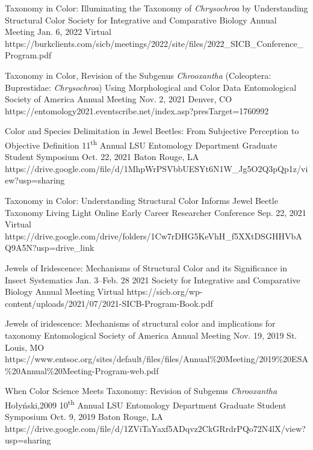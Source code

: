 \documentclass{article}
\newcommand{\ts}{\textsuperscript}
\begin{document}
{Taxonomy in Color: Illuminating the Taxonomy of \textit{Chrysochroa} by Understanding Structural Color}
{Society for Integrative and Comparative Biology Annual Meeting} 
{Jan. 6, 2022}
{Virtual}
{https://burkclients.com/sicb/meetings/2022/site/files/2022_SICB_Conference_Program.pdf}

{Taxonomy in Color, Revision of the Subgenus \textit{Chrooxantha} (Coleoptera: Buprestidae: \textit{Chrysochroa}) Using Morphological and Color Data}
{Entomological Society of America Annual Meeting}
{Nov. 2, 2021}
{Denver, CO}
{https://entomology2021.eventscribe.net/index.asp?presTarget=1760992}

{Color and Species Delimitation in Jewel Beetles: From Subjective Perception to Objective Definition}
{11\ts{th} Annual LSU Entomology Department Graduate Student Symposium}
{Oct. 22, 2021}
{Baton Rouge, LA}
{https://drive.google.com/file/d/1MhpWrPSVbbUESYt6N1W_Jg5O2Q3pQp1z/view?usp=sharing}

{Taxonomy in Color: Understanding Structural Color Informs Jewel Beetle Taxonomy}
{Living Light Online Early Career Researcher Conference}
{Sep. 22, 2021}
{Virtual}
{https://drive.google.com/drive/folders/1Cw7rDHG5KeVhH_f5XXtDSGHHVbAQ9A5N?usp=drive_link}

{Jewels of Iridescence: Mechanisms of Structural Color and its Significance in Insect Systematics}
{Jan. 3--Feb. 28 2021}
{Society for Integrative and Comparative Biology Annual Meeting} {Virtual}
{https://sicb.org/wp-content/uploads/2021/07/2021-SICB-Program-Book.pdf}

{Jewels of iridescence: Mechanisms of structural color and implications for taxonomy}
{Entomological Society of America Annual Meeting}
{Nov. 19, 2019}
{St. Louis, MO}
{https://www.entsoc.org/sites/default/files/files/Annual\%20Meeting/2019\%20ESA\%20Annual\%20Meeting-Program-web.pdf}

{When Color Science Meets Taxonomy: Revision of Subgenus \textit{Chrooxantha} Hołyński,2009}
{10\ts{th} Annual LSU Entomology Department Graduate Student Symposium}
{Oct. 9, 2019}
{Baton Rouge, LA}
{https://drive.google.com/file/d/1ZViTaYaxf5ADqvz2CkGRrdrPQo72N4lX/view?usp=sharing}
\end{document}
